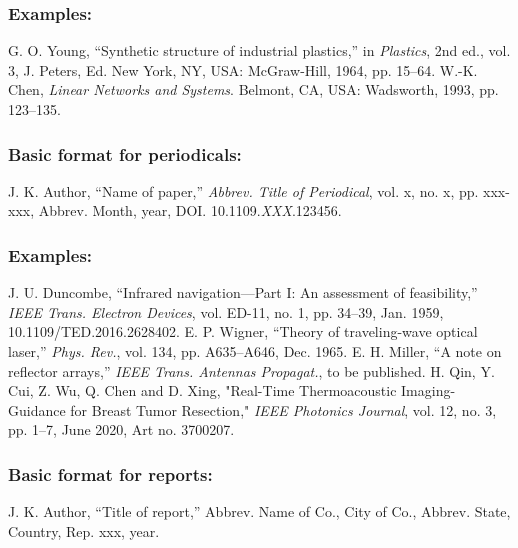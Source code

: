 \documentclass{IEEEoj}
\begin{document}
\subsubsection*{Examples:}

\begin{thebibliography}{00}
 G. O. Young, ``Synthetic structure of industrial
plastics,'' in \emph{Plastics}, 2nd ed., vol. 3, J. Peters, Ed. New York, NY, USA: McGraw-Hill, 1964, pp. 15--64.
 W.-K. Chen, \emph{Linear Networks and Systems}. Belmont, CA, USA: Wadsworth, 1993, pp. 123--135.
\end{thebibliography}

\subsubsection*{Basic format for periodicals:}

\begin{thebibliography}{00}
 J. K. Author, ``Name of paper,'' \textit{Abbrev. Title of Periodical}, vol. x, no. x, pp. xxx-xxx, Abbrev. Month, year, DOI.
10.1109.\textit{XXX}.123456.
\end{thebibliography}

\subsubsection*{Examples:}

\begin{thebibliography}{00}
 J. U. Duncombe, ``Infrared navigation---Part I: An
assessment of feasibility,'' \emph{IEEE Trans. Electron Devices}, vol. ED-11, no. 1, pp. 34--39, Jan. 1959, 10.1109/TED.2016.2628402.
 E. P. Wigner, ``Theory of traveling-wave optical laser,'' 
\emph{Phys. Rev.}, vol. 134, pp. A635--A646, Dec. 1965.
 E. H. Miller, ``A note on reflector arrays,'' \emph{IEEE
Trans. Antennas Propagat.}, to be published.
 H. Qin, Y. Cui, Z. Wu, Q. Chen and D. Xing, "Real-Time
Thermoacoustic Imaging-Guidance for Breast Tumor Resection," \emph{IEEE Photonics Journal}, vol. 12, no. 3, pp. 1--7, June 2020, Art no. 3700207.
\end{thebibliography}

\subsubsection*{Basic format for reports:}

\begin{thebibliography}{00}
 J. K. Author, ``Title of report,'' Abbrev. Name of Co., City of Co., Abbrev.
State, Country, Rep. {xxx}, year.
\end{thebibliography}
\end{document}
